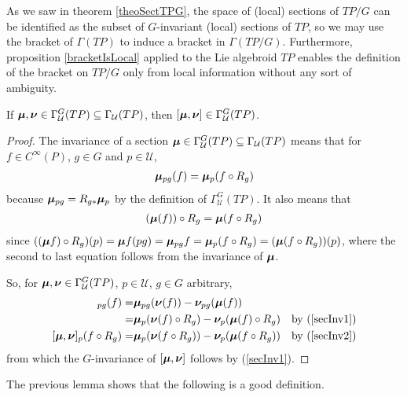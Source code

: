 As we saw in theorem \ref{theoSectTPG}, the space of (local) sections of $TP/G$ can be identified as the subset of $G$-invariant (local) sections of $TP$, so we may use the bracket of $\Gamma(TP)$ to induce a bracket in $\Gamma(TP/G)$. Furthermore, proposition \ref{bracketIsLocal} applied to the Lie algebroid $TP$ enables the definition of the bracket on $TP/G$ only from local information without any sort of ambiguity.

\begin{lemma}
If $\bm{\mu}, \bm{\nu} \in \Gamma_{\mathcal U}^G(TP) \subseteq \Gamma_{\mathcal U}(TP)$, then $[\bm{\mu}, \bm{\nu}] \in \Gamma_{\mathcal U}^G(TP)$.
\end{lemma}

\begin{proof}
The invariance of a section $\bm{\mu} \in \Gamma_{\mathcal U}^G(TP) \subseteq \Gamma_{\mathcal U}(TP)$ means that for $f \in C^\infty(P)$, $g \in G$ and $p \in \mathcal U$,  
\begin{align} \label{secInv1}
\bm{\mu}_{pg} (f) = \bm{\mu}_p(f \circ R_g)\end{align} 
because $\bm{\mu}_{pg} = R_{g*} \bm{\mu}_p$ by the definition of $\Gamma_{\mathcal U}^G(TP)$. It also means that 
\begin{align}\label{secInv2}
(\bm{\mu} (f)) \circ R_g = \bm{\mu}(f \circ R_g)
\end{align}
since $((\bm{\mu} f) \circ R_g)(p) = \bm{\mu} f(pg) = \bm{\mu}_{pg} f = \bm{\mu}_p(f \circ R_g) = (\bm{\mu}(f \circ R_g))(p)$, where the second to last equation follows from the invariance of $\bm{\mu}$.
    
So, for $\bm{\mu}, \bm{\nu} \in \Gamma_{\mathcal U}^G(TP)$, $p \in \mathcal U$, $g \in G$ arbitrary,
\begin{align*}
    [\sect \mu, \sect \nu]_{pg}(f)
        =& \sect \mu_{pg}(\sect \nu(f)) - \sect \nu_{pg}(\sect \mu (f))\\
        =& \sect \mu_{p}(\sect \nu(f) \circ R_g) - \sect \nu_{p}(\sect \mu (f) \circ R_g) & \textrm{by } (\ref{secInv1})\\
    [\sect \mu, \sect \nu]_p (f \circ R_g) =& \sect \mu_p(\sect \nu(f \circ R_g)) - \sect \nu_p(\sect \mu(f \circ R_g)) & \textrm{by } (\ref{secInv2})
\end{align*}
from which the $G$-invariance of $[\bm{\mu}, \bm{\nu}]$ follows by (\ref{secInv1}).
\end{proof}

The previous lemma shows that the following is a good definition.


